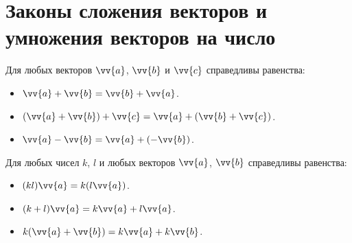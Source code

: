 \section{Законы сложения векторов и умножения векторов на число}
Для любых векторов $\vv{a}$, $\vv{b}$ и $\vv{c}$
справедливы равенства:

{\large
\begin{itemize}
  \item $\vv{a}+\vv{b} =\vv{b}+\vv{a}$.
  \item $(\vv{a}+\vv{b})+\vv{c} =\vv{a}+(\vv{b}+\vv{c})$.
  \item $\vv{a}-\vv{b} =\vv{a}+(-\vv{b})$.
\end{itemize}
}

Для любых чисел $k$, $l$ и любых векторов $\vv{a}$, $\vv{b}$
справедливы равенства:

{\large
  \begin{itemize}
  \item $(kl)\vv{a} = k(l\vv{a})$.
  \item $(k+l)\vv{a} = k\vv{a}+l\vv{a}$.
  \item $k(\vv{a}+\vv{b}) = k\vv{a}+k\vv{b}$.
\end{itemize}
}

